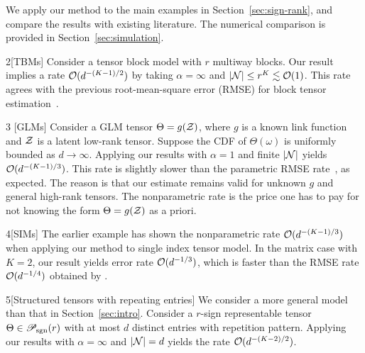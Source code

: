\documentclass{article}
\theoremstyle{plain}
\theoremstyle{definition}
\def\caliP{\mathscr{P}_{\textup{sgn}}}
\begin{document}
We apply our method to the main examples in Section~\ref{sec:sign-rank}, and compare the results with existing literature. The numerical comparison is provided in Section~\ref{sec:simulation}. 

\begin{customexample}{2}[TBMs]
Consider a tensor block model with $r$ multiway blocks. Our result implies a rate $\mathcal{O}(d^{-(K-1)/2})$ by taking $\alpha=\infty$ and $|\mathcal{N}| \leq r^K\lesssim \mathcal{O}(1)$. This rate agrees with the  previous root-mean-square error (RMSE) for block tensor estimation~\citep{wang2019multiway}.
\end{customexample}


\begin{customexample}{3} [GLMs] 
Consider a GLM tensor $\Theta=g(\mathcal{Z})$, where $g$ is a known link function and $\mathcal{Z}$ is a latent low-rank tensor. Suppose the CDF of $\Theta(\omega)$ is uniformly bounded as $d\to\infty$. Applying our results with $\alpha=1$ and finite $|\mathcal{N}|$ yields $\mathcal{O}(d^{-(K-1)/3})$. This rate is slightly slower than the parametric RMSE rate~\citep{zhang2018tensor,wang2018learning}, as expected. The reason is that our estimate remains valid for unknown $g$ and general high-rank tensors. The nonparametric rate is the price one has to pay for not knowing the form $\Theta=g(\mathcal{Z})$ as a priori. 
\end{customexample}

\begin{customexample}{4}[SIMs]
The earlier example has shown the nonparametric rate $\mathcal{O}(d^{-(K-1)/3})$ when applying our method to single index tensor model. In the matrix case with $K=2$, our result yields error rate $\mathcal{O}(d^{-1/3})$, which is faster than the RMSE rate $\mathcal{O}(d^{-1/4})$ obtained by \cite{ganti2015matrix}. 
\end{customexample}

\begin{customexample}{5}[Structured tensors with repeating entries]
We consider a more general model than that in Section~\ref{sec:intro}. Consider a $r$-sign representable tensor $\Theta\in \caliP(r)$ with at most $d$ distinct entries with repetition pattern. Applying our results with $\alpha=\infty$ and $|\mathcal{N}|=d$ yields the rate $\mathcal{O}(d^{-(K-2)/2})$. %
\end{customexample}
\end{document}
